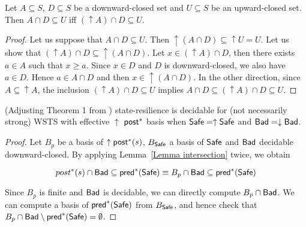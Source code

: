 \begin{lemma}\label{Lemma intersection}
Let $A \subseteq S$, $D \subseteq S$ be a downward-closed set and $U \subseteq S$ be an upward-closed set. 
Then $A \cap D \subseteq U$  iff $ (\uparrow  A) \cap D \subseteq U$.
\end{lemma}


\begin{proof}
Let us suppose that $A \cap D \subseteq U$. Then ${\uparrow (A \cap D)} \subseteq {\uparrow U} = U$.
Let us show that $({\uparrow A}) \cap D \subseteq {\uparrow (A \cap D)}$.
Let $x \in ({\uparrow A}) \cap D$, then there exists $a \in A$ such that $x \geq a$.
Since $x \in D$ and $D$ is downward-closed, we also have $a \in D$.
Hence $a \in A \cap D$ and then $x \in { \uparrow (A \cap D)}$.
In the other direction,
since $A \subseteq {\uparrow A}$, the inclusion
$({\uparrow  A}) \cap D \subseteq U$ implies
$A \cap D \subseteq ({\uparrow  A}) \cap D \subseteq U$.
\end{proof}



\begin{theorem}{(Adjusting Theorem 1 from \cite{DBLP:journals/corr/abs-2108-00889})}\label{post srp}
{\sc state-resilience} is decidable for (not necessarily strong) WSTS with effective 
$\uparrow$ $\textsf{post}^*$ basis
when
$\textsf{Safe}=\uparrow \textsf{Safe}$
and $\textsf{Bad}=\downarrow \textsf{Bad}$.
\end{theorem}


\begin{proof}
Let $B_p$ be a basis of $\uparrow \textsf{post}^*(s)$, $B_{\textsf{Safe}}$ a basis of $\textsf{Safe}$
and $\textsf{Bad}$ decidable downward-closed.
By applying Lemma~\ref{Lemma intersection} twice, we obtain

$$ post^*(s) \cap \textsf{Bad} \subseteq \textsf{pred}^*(\textsf{Safe}) \equiv B_p \cap \textsf{Bad} \subseteq \textsf{pred}^*(\textsf{Safe})$$


Since $B_p$ is finite and $\textsf{Bad}$ is decidable, we can directly compute $ B_p \cap \textsf{Bad}$.
We can compute a basis of $\textsf{pred}^*(\textsf{Safe})$ from $B_{\textsf{Safe}}$, and hence check that $B_p \cap \textsf{Bad} \setminus \textsf{pred}^*(\textsf{Safe}) = \emptyset$. 
\end{proof}

%
%



